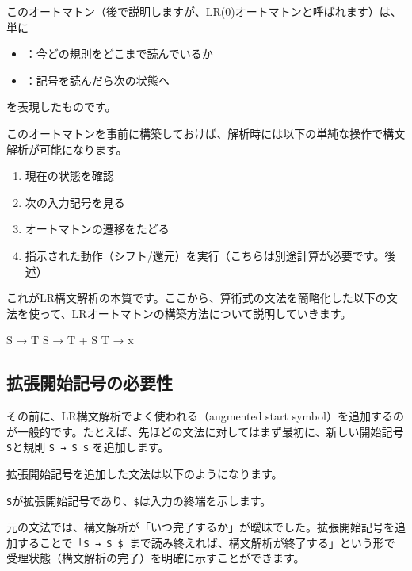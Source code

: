 このオートマトン（後で説明しますが、LR(0)オートマトンと呼ばれます）は、単に

\begin{itemize}
\item
  ：今どの規則をどこまで読んでいるか
\item
  ：記号を読んだら次の状態へ
\end{itemize}

\noindent を表現したものです。

このオートマトンを事前に構築しておけば、解析時には以下の単純な操作で構文解析が可能になります。

\begin{enumerate}
\item
  現在の状態を確認
\item
  次の入力記号を見る
\item
  オートマトンの遷移をたどる
\item
  指示された動作（シフト/還元）を実行（こちらは別途計算が必要です。後述）
\end{enumerate}

これがLR構文解析の本質です。ここから、算術式の文法を簡略化した以下の文法を使って、LRオートマトンの構築方法について説明していきます。

\begin{codescreen}{}
S → T
S → T + S
T → x
\end{codescreen}

\subsection{拡張開始記号の必要性}

その前に、LR構文解析でよく使われる（augmented start
symbol）を追加するのが一般的です。たとえば、先ほどの文法に対してはまず最初に、新しい開始記号\texttt{S\textquotesingle{}}と規則
\texttt{S\textquotesingle{}\ →\ S\ \$} を追加します。

拡張開始記号を追加した文法は以下のようになります。


\texttt{S\textquotesingle{}}が拡張開始記号であり、\texttt{\$}は入力の終端を示します。

元の文法では、構文解析が「いつ完了するか」が曖昧でした。拡張開始記号を追加することで「\texttt{S\textquotesingle{}\ →\ S\ \$ }まで読み終えれば、構文解析が終了する」という形で受理状態（構文解析の完了）を明確に示すことができます。

